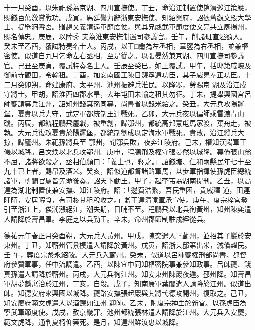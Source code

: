 \begin{pinyinscope}
 十一月癸酉，以朱祀孫為京湖、四川宣撫使。丁丑，命沿江制置使趙溍巡江策應，賜錢百萬激賞戰功。戊寅，馬廷鸞力辭浙東安撫使、知紹興府，詔依舊觀文殿大學士、提舉洞霄宮。贈趙文義清遠軍節度使，與其兄威武軍節度使文亮共立廟揚州，賜名傳忠。庚辰，以陸秀
 夫為淮東安撫制置司參議官。壬午，削諸班直溢額人。癸未至乙酉，覆試特奏名士人。丙戌，以王□龠為左丞相，章鑒為右丞相，並兼樞密使。似道自九月乞命左右丞相，至是從之。以張晏然兼京湖、四川宣撫司參議官。己丑至庚寅，覆試特奏名士人。壬辰至癸巳，如上覆試。甲午，括邸第戚畹及御前寺觀田，令輸租。丁酉，加安南國王陳日煚寧遠功臣，其子威晃奉正功臣。十二月癸卯朔，命建康府、太平州、池州振避兵淮民。以隆寒，勞賜京
 湖及沿江戍守將士。甲胡，詔淮西四郡水旱，去年屯田未輸之租其勿征。丁未，提舉興國宮呂師夔請募兵江州，詔知州錢真孫同募，尚書省以錢米給之。癸丑，大元兵攻陽邏堡，夏貴以兵力守，武定軍都統制王達戰死。乙卯，大元兵夜以偏師乘雪渡青山磯。丙辰，都統程鵬飛鏖戰，被重創，歸鄂州，都統高邦憲屯馬家渡，棄舟走，被執。大元兵復攻夏貴於陽邏堡，都統制劉成以定海水軍戰死。貴敗，沿江縱兵大掠，歸廬州。朱祀孫將兵至
 鄂州，聞鄂兵敗，夜奔江陵府。己未，權知漢陽軍王儀以城降。呂文煥以北兵攻鄂州。庚申，程鵬飛及權守張晏然以城降。幕僚張山翁不屈，諸將欲殺之，丞相伯顏曰：「義士也，釋之。」詔錢塘、仁和兩縣民年七十至九十已上者，賜帛及酒米。癸亥，詔似道都督諸路軍馬，以步軍指揮使孫虎臣總統諸軍，所闢官屬皆先命後奏。詔天下勤王。甲子，起李芾為湖南提刑。乙丑，以高達為湖北制置使兼安撫、知江陵府。詔：「邊費浩繁，吾民重困，貴戚釋
 道，田連阡陌，安居暇食，有司核其租稅收之。」贈王達清遠軍承宣使。庚午，度宗梓宮發引至浙江上，俟潮漲絕江，潮失期，日晡不至。程鵬飛以北兵徇黃州，知州陳奕遣人請降於壽昌軍。李庭芝以兵勤王。辛未，命州郡節制駐戍經從兵。



 德祐元年春正月癸酉朔，大元兵入黃州。甲戌，陳奕遣人下蘄州，並招其子巖於安東州。丁丑，知蘄州管景模遣人請降於黃州。戊寅，詔浙東邸第出米，減價糶民。壬
 午，葬度宗於永紹陵。大元兵入蘄州。癸未，似道以呂師夔權刑部尚書、都督府參贊軍事，任中流調遣。乙酉，以陳宜中同知樞密院事兼參知政事。呂師夔、錢真孫遣人請降於蘄州。丙戌，大元兵徇江州。知安東州陳巖夜遁。邳州降。知壽昌軍胡夢麟寓治於江州，丁亥，自殺。戊子，知南康軍葉閶遣人請降於江州。似道出師。知德安府來興國以城降。夔路安撫張起巖與其將弋德攻開州，復取之。己丑，知安慶府範文虎遣人以酒饌如江州
 迎師。乙未，附度宗神主於新宮。以孫虎臣為寧武軍節度使。戊戌，赦京畿罪。池州都統張林遣人請降於江州。大元兵入安慶，範文虎降，通判夏椅仰藥死。是月，知達州鮮汝忠以城降。




\end{pinyinscope}
